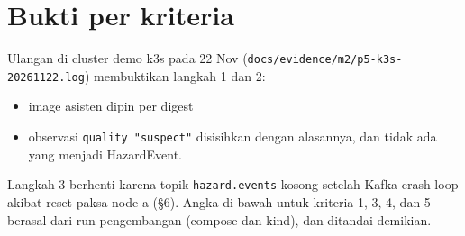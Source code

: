 \section{Bukti per kriteria}

Ulangan di cluster demo k3s pada 22 Nov (\texttt{docs/\allowbreak{}evidence/\allowbreak{}m2/\allowbreak{}p5-\allowbreak{}k3s-\allowbreak{}20261122.\allowbreak{}log}) membuktikan langkah 1 dan 2:

\begin{itemize}
\item image asisten dipin per digest
\item observasi \texttt{quality "suspect"} disisihkan dengan alasannya, dan tidak ada yang menjadi HazardEvent.
\end{itemize}

Langkah 3 berhenti karena topik \texttt{hazard.\allowbreak{}events} kosong setelah Kafka crash-loop akibat reset paksa node-a (§6). Angka di bawah untuk kriteria 1, 3, 4, dan 5 berasal dari run pengembangan (compose dan kind), dan ditandai demikian.



